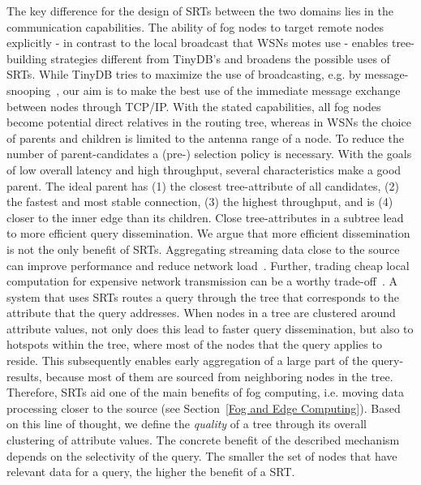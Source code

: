   The key difference for the design of SRTs between the two domains lies in the communication capabilities. The ability of fog nodes to target remote nodes explicitly - in contrast to the local broadcast that WSNs motes use - enables tree-building strategies different from TinyDB's and broadens the possible uses of SRTs. While TinyDB tries to maximize the use of broadcasting, e.g. by message-snooping~\cite{madden_tinydb:_2005}, our aim is to make the best use of the immediate message exchange between nodes through TCP/IP. With the stated capabilities, all fog nodes become potential direct relatives in the routing tree, whereas in WSNs the choice of parents and children is limited to the antenna range of a node. To reduce the number of parent-candidates a (pre-) selection policy is necessary. With the goals of low overall latency and high throughput, several characteristics make a good parent. The ideal parent has (1) the closest tree-attribute of all candidates, (2) the fastest and most stable connection, (3) the highest throughput, and is (4) closer to the inner edge than its children. Close tree-attributes in a subtree lead to more efficient query dissemination. We argue that more efficient dissemination is not the only benefit of SRTs. Aggregating streaming data close to the source can improve performance and reduce network load~\cite{benson_disco_2020}. Further, trading cheap local computation for expensive network transmission can be a worthy trade-off~\cite{yao_cougar_2002}. A system that uses SRTs routes a query through the tree that corresponds to the attribute that the query addresses. When nodes in a tree are clustered around attribute values, not only does this lead to faster query dissemination, but also to hotspots within the tree, where most of the nodes that the query applies to reside. This subsequently enables early aggregation of a large part of the query-results, because most of them are sourced from neighboring nodes in the tree. Therefore, SRTs aid one of the main benefits of fog computing, i.e. moving data processing closer to the source (see Section~\ref{Fog and Edge Computing}). Based on this line of thought, we define the \textit{quality} of a tree through its overall clustering of attribute values. The concrete benefit of the described mechanism depends on the selectivity of the query. The smaller the set of nodes that have relevant data for a query, the higher the benefit of a SRT. 
  
